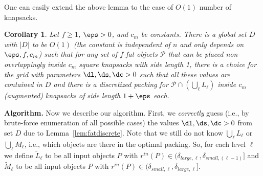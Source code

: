 \documentclass[10pt,a4paper]{article}
\newtheorem{corollary}{Corollary}[section]
\theoremstyle{plain}
\theoremstyle{plain}
\theoremstyle{plain}
\theoremstyle{definition}
\def\rem#1{{\marginpar{\raggedright\scriptsize #1}}}
\newcommand{\awr}[1]{\rem{\textcolor{orange}{$\bullet$ #1}}}
\newcommand{\arir}[1]{}
\newcommand{\ari}[1]{#1}
\newcommand{\ag}[1]{#1}
\begin{document}
One can easily extend the above lemma to the case of $O(1)$ number of knapsacks.
\begin{corollary}
\label{corr:fatdiscrete} Let $f\ge1$, $\eps>0$, and $c_m$ be constants.
There is a global set $D$ with $|D|$ to be $ O(1)$ (the constant is independent of $n$ and only depends on $\eps, f, c_m$) such that for
any set of $f$-fat objects $\mathcal{P}$ that can be placed non-overlappingly
inside $c_m$ square knapsacks with side length 1, there is a choice for the
grid with parameters $\dl,\ds,\dc>0$ such that all these values are
contained in $D$ and there is a discretized packing for $\mathcal{P}\cap (\bigcup_{\ell}L_{\ell})$
inside $c_m$ (augmented) knapsacks of side length $1+\eps$ each. 
\end{corollary}

\noindent \textbf{Algorithm.} \ari{Now we describe our algorithm. First, we {\em correctly} guess (i.e., by brute-force enumeration of all possible cases) the values $\dl,\ds,\dc>0$ from set $D$
 due to Lemma~\ref{lem:fatdiscrete}. 
Note that we still do not know $\bigcup_{\ell} L_{\ell}$ or $\bigcup_{\ell} M_{\ell}$, i.e., which objects are there in the optimal packing. 
So, for each level $\ell$ we define
$\tilde{L}_{\ell}$ to be all input objects
$P$ with $r^{\ag{in}}(P)\in(\delta_{large,\ell},\delta_{small,{(\ell-1)}}]$ and  
$\tilde{M}_{\ell}$ to be all input objects $P$ with $r^{in}(P)\in(\delta_{small,\ell},\delta_{large,\ell}]$.}
\arir{Used $\tilde{L}_{\ell}$ instead of ${L}_{\ell}$. As  ${L}_{\ell}$ refers to items in optimal packing. Please check the whole para.}
\end{document}
